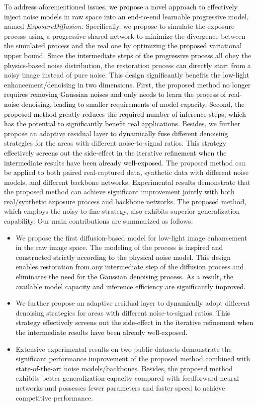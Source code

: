 \documentclass[10pt,twocolumn,letterpaper]{article}
\newcommand{\wh}[1]{\textcolor{black}{#1}}
\begin{document}
To \wh{address} aforementioned \wh{issues, we propose a novel approach to effectively inject noise models in raw space into an end-to-end learnable progressive model}, named \textit{ExposureDiffusion}. 
Specifically, we propose to simulate the exposure process using a \wh{progressive} shared network \wh{to minimize} the divergence between the simulated process and the real one by \wh{optimizing the proposed variational} upper bound.
Since \wh{the intermediate steps of the progressive process} all obey the physics-based noise distribution, the restoration process can \wh{directly} start from a noisy image instead of pure noise.
\wh{This design significantly benefits the low-light enhancement/denoising in two dimensions.
First, the proposed method no longer requires removing Gaussian noises and only needs to learn the process of real-noise denoising, leading to smaller requirements of model capacity.
Second, the proposed method greatly reduces the required number of inference steps, which has the potential to significantly benefit real applications.}
Besides, we further propose an adaptive residual layer to \wh{dynamically fuse} different denoising strategies for the areas with different noise-to-signal ratios.
\wh{This strategy effectively screens out the side-effect in the iterative refinement when the intermediate results have been already well-exposed.}
The proposed method can be \wh{applied to} both paired real-captured data, synthetic data with different noise models, and different backbone networks. 
Experimental results demonstrate that the proposed method can achieve \wh{significant} improvement \wh{jointly with both real/synthetic} exposure process and backbone networks. The proposed method, which employs the noisy-to-fine strategy, also exhibits superior generalization capability. Our main contributions are summarized as follows:
\begin{itemize}
\vspace{-0.2cm}
    \setlength\topsep{-1cm}
    \setlength\itemsep{-0.10cm}
    \item We propose the first diffusion-based model for low-light image enhancement in the raw image space. The modeling of the process is \wh{inspired and constructed strictly according to the physical noise model}.
\wh{This design enables restoration from any intermediate step of the diffusion process and eliminates the need for the Gaussian denoising process. As a result, the available model capacity and inference efficiency are significantly improved.}
\item We further propose an adaptive residual layer to \wh{dynamically} adopt different denoising strategies for areas with different noise-to-signal ratios.
\wh{This strategy effectively screens out the side-effect in the iterative refinement when the intermediate results have been already well-exposed.}
\item Extensive experimental results on two public datasets demonstrate the \wh{significant} performance improvement of the proposed method combined with \wh{state-of-the-art} noise models/backbones. Besides, the proposed method exhibits better generalization \wh{capacity} compared with feedforward \wh{neural} networks and possesses fewer parameters and faster speed \wh{to achieve competitive} performance. 
\end{itemize}
\end{document}
